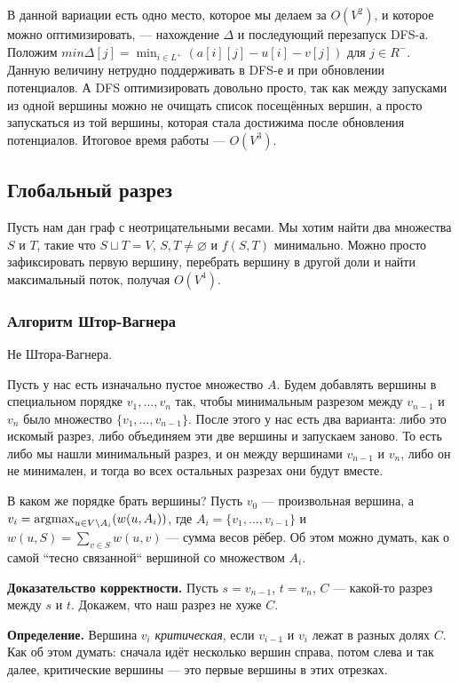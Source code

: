 В данной вариации есть одно место, которое мы делаем за $O(V^2)$, и которое можно оптимизировать, --- нахождение $\Delta$ и последующий перезапуск DFS-а.
Положим $min\Delta[j] = \min_{i \in L^+}(a[i][j] - u[i] - v[j])$ для $j \in R^-$.
Данную величину нетрудно поддерживать в DFS-е и при обновлении потенциалов.
А DFS оптимизировать довольно просто, так как между запусками из одной вершины можно не очищать список посещённых вершин, а просто запускаться из той вершины, которая стала достижима после обновления потенциалов.
Итоговое время работы --- $O(V^3)$.

\subsection{Глобальный разрез}
Пусть нам дан граф с неотрицательными весами.
Мы хотим найти два множества $S$ и $T$, такие что $S \sqcup T = V$, $S, T \ne \varnothing$ и $f(S, T)$ минимально.
Можно просто зафиксировать первую вершину, перебрать вершину в другой доли и найти максимальный поток, получая $O(V^4)$.

\subsubsection{Алгоритм Штор-Вагнера}
Не Штора-Вагнера.

Пусть у нас есть изначально пустое множество $A$.
Будем добавлять вершины в специальном порядке $v_1, \dots, v_n$ так, чтобы минимальным разрезом между $v_{n-1}$ и $v_n$ было множество $\{v_1, \dots, v_{n-1}\}$.
После этого у нас есть два варианта: либо это искомый разрез, либо объединяем эти две вершины и запускаем заново.
То есть либо мы нашли минимальный разрез, и он между вершинами $v_{n-1}$ и $v_n$, либо он не минимален, и тогда во всех остальных разрезах они будут вместе.

В каком же порядке брать вершины? Пусть $v_0$ --- произвольная вершина, а $v_i = \operatorname{argmax}_{u \in V \setminus A_i}(w(u, A_i))$, где $A_i = \{v_1, \dots, v_{i-1}\}$ и $w(u, S) = \sum_{v \in S} w(u, v)$ --- сумма весов рёбер.
Об этом можно думать, как о самой ``тесно связанной`` вершиной со множеством $A_i$.

\textbf{Доказательство корректности.} Пусть $s = v_{n-1}$, $t = v_n$, $C$ --- какой-то разрез между $s$ и $t$. Докажем, что наш разрез не хуже $C$.

\textbf{Определение.} Вершина $v_i$ \textit{критическая}, если $v_{i-1}$ и $v_i$ лежат в разных долях $C$.
Как об этом думать: сначала идёт несколько вершин справа, потом слева и так далее, критические вершины --- это первые вершины в этих отрезках.

